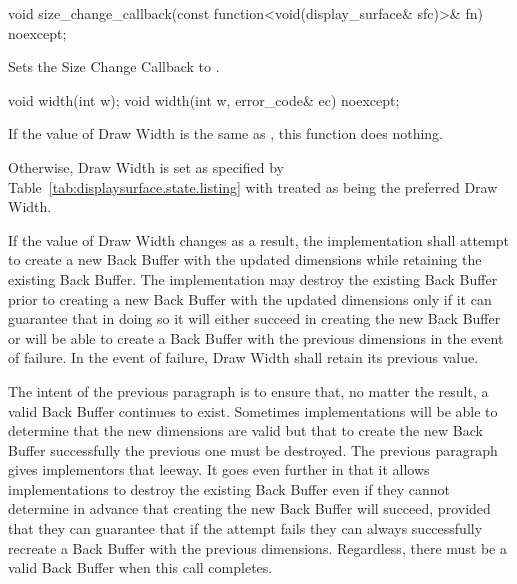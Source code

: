 \begin{itemdecl}
void size_change_callback(const function<void(display_surface& sfc)>& fn)
  noexcept;
\end{itemdecl}
\begin{itemdescr}
\pnum
\effects
Sets the Size Change Callback to .
\end{itemdescr}

\begin{itemdecl}
void width(int w);
void width(int w, error_code& ec) noexcept;
\end{itemdecl}
\begin{itemdescr}
\pnum
\effects
If the value of Draw Width is the same as , this function does nothing.

\pnum
Otherwise, Draw Width is set as specified by Table~\ref{tab:displaysurface.state.listing} with  treated as being the preferred Draw Width.

\pnum
If the value of Draw Width changes as a result, the implementation shall attempt to create a new Back Buffer with the updated dimensions while retaining the existing Back Buffer. The implementation may destroy the existing Back Buffer prior to creating a new Back Buffer with the updated dimensions only if it can guarantee that in doing so it will either succeed in creating the new Back Buffer or will be able to create a Back Buffer with the previous dimensions in the event of failure. In the event of failure, Draw Width shall retain its previous value.

\pnum
\enternote
The intent of the previous paragraph is to ensure that, no matter the result, a valid Back Buffer continues to exist. Sometimes implementations will be able to determine that the new dimensions are valid but that to create the new Back Buffer successfully the previous one must be destroyed. The previous paragraph gives implementors that leeway. It goes even further in that it allows implementations to destroy the existing Back Buffer even if they cannot determine in advance that creating the new Back Buffer will succeed, provided that they can guarantee that if the attempt fails they can always successfully recreate a Back Buffer with the previous dimensions. Regardless, there must be a valid Back Buffer when this call completes.
\exitnote


\end{itemdescr}
